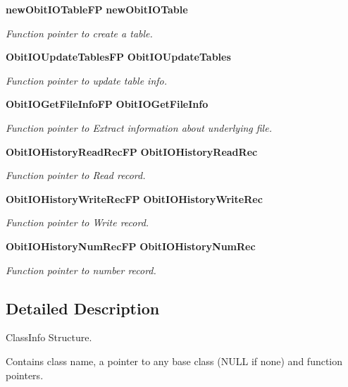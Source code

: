 \begin{CompactItemize}
{\bf new\-Obit\-IOTable\-FP} {\bf new\-Obit\-IOTable}
\begin{CompactList}\small\item\em Function pointer to create a table. \item\end{CompactList}\item 
{\bf Obit\-IOUpdate\-Tables\-FP} {\bf Obit\-IOUpdate\-Tables}
\begin{CompactList}\small\item\em Function pointer to update table info. \item\end{CompactList}\item 
{\bf Obit\-IOGet\-File\-Info\-FP} {\bf Obit\-IOGet\-File\-Info}
\begin{CompactList}\small\item\em Function pointer to Extract information about underlying file. \item\end{CompactList}\item 
{\bf Obit\-IOHistory\-Read\-Rec\-FP} {\bf Obit\-IOHistory\-Read\-Rec}
\begin{CompactList}\small\item\em Function pointer to Read record. \item\end{CompactList}\item 
{\bf Obit\-IOHistory\-Write\-Rec\-FP} {\bf Obit\-IOHistory\-Write\-Rec}
\begin{CompactList}\small\item\em Function pointer to Write record. \item\end{CompactList}\item 
{\bf Obit\-IOHistory\-Num\-Rec\-FP} {\bf Obit\-IOHistory\-Num\-Rec}
\begin{CompactList}\small\item\em Function pointer to number record. \item\end{CompactList}\end{CompactItemize}


\subsection{Detailed Description}
Class\-Info Structure. 

Contains class name, a pointer to any base class (NULL if none) and function pointers. 




